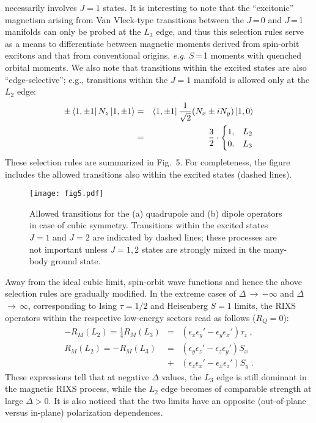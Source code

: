 \documentclass[twocolumn,prb,aps,showpacs,superscriptaddress]{revtex4-1}
\begin{document}
necessarily involves $J=1$ states\cite{Khaliullin13,Meetei15}. It is 
interesting to note that the ``excitonic'' magnetism\cite{Khaliullin13} arising
from Van Vleck-type transitions between the $J$\,=\,0 and $J$\,=\,1 manifolds 
can only be probed at the $L_3$ edge, and thus this selection rules serve as 
a means to differentiate between magnetic moments derived from spin-orbit 
excitons and that from conventional origins, {\it e.g.} $S$\,=\,1 moments 
with quenched orbital moments. We also note that transitions within the
excited states are also ``edge-selective''; e.g., transitions within the 
$J=1$ manifold is allowed only at the $L_2$ edge:
\begin{eqnarray}
\pm\bra{1,\pm 1}N_z\ket{1,\pm 1}&=&\bra{1,\pm 1}\frac{1}{\sqrt{2}}
(N_x \pm i N_y)\ket{1,0}\nonumber\\
&=&\frac{3}{2}\cdot
\begin{cases} 
	1, & L_2 \\
	0. & L_3
\end{cases}
\end{eqnarray}
These selection rules are summarized in Fig.~5. For completeness, the figure 
includes the allowed transitions also within the excited states (dashed lines).

\begin{figure}
\centerline{\texttt{[image: fig5.pdf]}}
\caption{Allowed transitions for the (a) quadrupole and (b) dipole operators 
in case of cubic symmetry. Transitions within the excited states $J=1$ 
and $J=2$ are indicated by dashed lines; these processes are not important 
unless $J=1, 2$ states are strongly mixed in the many-body ground state.} 
\end{figure}

Away from the ideal cubic limit, spin-orbit wave functions and hence the above 
selection rules are gradually modified. In the extreme cases of  
$\Delta$\,$\rightarrow$\,$-\infty$ and $\Delta$\,$\rightarrow$\,$\infty$, 
corresponding to Ising $\tau=1/2$ and Heisenberg $S=1$ limits, the RIXS 
operators within the respective low-energy sectors read as follows ($R_Q=0$): 
\begin{eqnarray}
-R_M(L_2)=\tfrac{1}{4}R_M(L_3)
&=&(\epsilon_x \epsilon_y'-\epsilon_y \epsilon_x')\tau_z\;, \\
R_M(L_2)=-R_M(L_3)&=&
(\epsilon_y \epsilon_z'-\epsilon_z \epsilon_y')S_x \nonumber \\
&+&(\epsilon_z \epsilon_x'-\epsilon_x \epsilon_z')S_y\;.
\end{eqnarray}
These expressions tell that at negative $\Delta$ values, the $L_3$ edge is
still dominant in the magnetic RIXS process, while the $L_2$ edge becomes of 
comparable strength at large $\Delta>0$. It is also noticed that the two
limits have an opposite (out-of-plane versus in-plane) polarization
dependences. 
\end{document}
